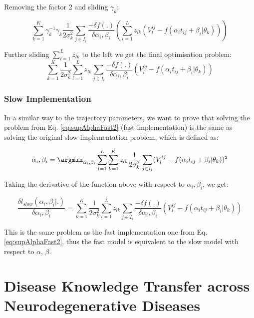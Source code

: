 Removing the factor 2 and sliding $\gamma_k$:

\begin{equation}
 \sum_{k=1}^K \gamma_k^{-1} \gamma_k \frac{1}{2\sigma_k^2} \sum_{j \in I_i} \frac{-\delta f(.)}{\delta \alpha_i, \beta_i}  \left( \sum_{l=1}^L  z_{lk} (V_l^{ij} - f(\alpha_i t_{ij} + \beta_i | \theta_k)) \right) 
\end{equation}

Further sliding $\sum_{l=1}^L z_{lk}$ to the left we get the final optimisation problem:
\begin{equation}
\label{eq:supAlphaFast2}
 \sum_{k=1}^K  \frac{1}{2\sigma_k^2} \sum_{l=1}^L z_{lk} \sum_{j \in I_i} \frac{- \delta f(.)}{\delta \alpha_i, \beta_i} (V_l^{ij} - f(\alpha_i t_{ij} + \beta_i | \theta_k))
\end{equation}


\subsection{Slow Implementation}

In a similar way to the trajectory parameters, we want to prove that solving the problem from Eq. \ref{eq:supAlphaFast2} (fast implementation) is the same as solving the original slow implementation problem, which is defined as:

\begin{equation}
 \alpha_i, \beta_i = \argmin_{\alpha_i, \beta_i}   \sum_{l=1}^L \sum_{k=1}^K z_{lk} \frac{1}{2\sigma_k^2} \sum_{j \in I_i} (V_l^{ij} - f(\alpha_i t_{ij} + \beta_i | \theta_k))^2
\end{equation}

Taking the derivative of the function above with respect to $\alpha_i, \beta_i$, we get:

\begin{equation}
 \frac{\delta l_{slow}(\alpha_i, \beta_i|.)}{\delta \alpha_i, \beta_i} = \sum_{k=1}^K \frac{1}{2\sigma_k^2} \sum_{l=1}^L z_{lk} \sum_{j \in I_i} \frac{- \delta f(.)}{\delta \alpha_i, \beta_i} (V_l^{ij} - f(\alpha_i t_{ij} + \beta_i | \theta_k))
\end{equation}

This is the same problem as the fast implementation one from Eq. \ref{eq:supAlphaFast2}, thus the fast model is equivalent to the slow model with respect to $\alpha$, $\beta$.



\chapter{Disease Knowledge Transfer across Neurodegenerative Diseases}

